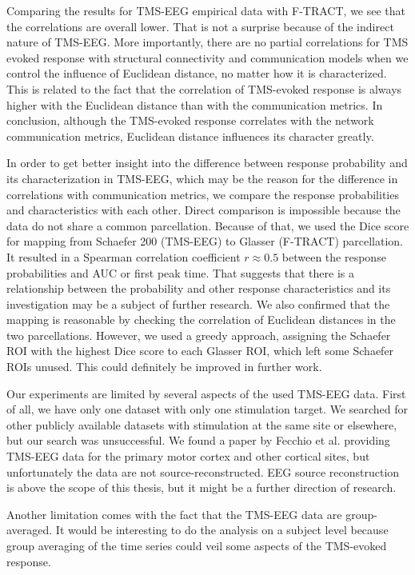 Comparing the results for TMS-EEG empirical data with F-TRACT, we see that the correlations are overall lower. That is not a surprise because of the indirect nature of TMS-EEG. More importantly, there are no partial correlations for TMS evoked response with structural connectivity and communication models when we control the influence of Euclidean distance, no matter how it is characterized. This is related to the fact that the correlation of TMS-evoked response is always higher with the Euclidean distance than with the communication metrics. In conclusion, although the TMS-evoked response correlates with the network communication metrics, Euclidean distance influences its character greatly.

In order to get better insight into the difference between response probability and its characterization in TMS-EEG, which may be the reason for the difference in correlations with communication metrics, we compare the response probabilities and characteristics with each other. Direct comparison is impossible because the data do not share a common parcellation. Because of that, we used the Dice score for mapping from Schaefer 200 (TMS-EEG) to Glasser (F-TRACT) parcellation. It resulted in a Spearman correlation coefficient $r\approx0.5$ between the response probabilities and AUC or first peak time. That suggests that there is a relationship between the probability and other response characteristics and its investigation may be a subject of further research. We also confirmed that the mapping is reasonable by checking the correlation of Euclidean distances in the two parcellations. However, we used a greedy approach, assigning the Schaefer ROI with the highest Dice score to each Glasser ROI, which left some Schaefer ROIs unused. This could definitely be improved in further work.

Our experiments are limited by several aspects of the used TMS-EEG data. First of all, we have only one dataset with only one stimulation target. We searched for other publicly available datasets with stimulation at the same site or elsewhere, but our search was unsuccessful. We found a paper by Fecchio et al. \cite{fecchio_spectral_2017} providing TMS-EEG data for the primary motor cortex and other cortical sites, but unfortunately the data are not source-reconstructed. EEG source reconstruction is above the scope of this thesis, but it might be a further direction of research.

Another limitation comes with the fact that the TMS-EEG data are group-averaged. It would be interesting to do the analysis on a subject level because group averaging of the time series could veil some aspects of the TMS-evoked response.



